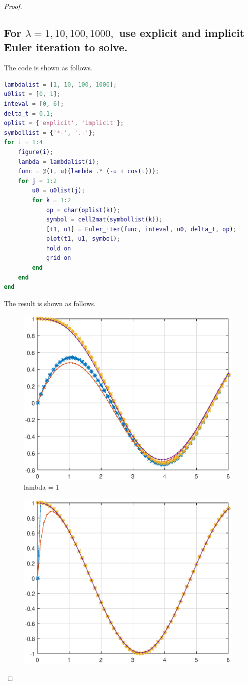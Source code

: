 \documentclass{article}
\begin{document}
\begin{proof}
\subsection{For $\lambda = 1,10,100,1000,$ use explicit and implicit Euler iteration to solve.}
The code is shown as follows.
\begin{lstlisting}[language={MATLAB}]
lambdalist = [1, 10, 100, 1000];
u0list = [0, 1];
inteval = [0, 6];
delta_t = 0.1;
oplist = {'explicit', 'implicit'};
symbollist = {'*-', '.-'};
for i = 1:4
    figure(i);
    lambda = lambdalist(i);
    func = @(t, u)(lambda .* (-u + cos(t)));
    for j = 1:2
        u0 = u0list(j);
        for k = 1:2
            op = char(oplist(k));
            symbol = cell2mat(symbollist(k));
            [t1, u1] = Euler_iter(func, inteval, u0, delta_t, op);
            plot(t1, u1, symbol);
            hold on
            grid on
        end
    end
end
\end{lstlisting}
The result is shown as follows.
\begin{figure}[htbp]
\centering
\includegraphics[width = 15cm]{lambda=1.eps}
\caption{lambda = 1}
\label{Lambda1}
\end{figure}
\begin{figure}[htbp]
\centering
\includegraphics[width = 15cm]{lambda=10.eps}

\end{figure}
\end{proof}
\end{document}
